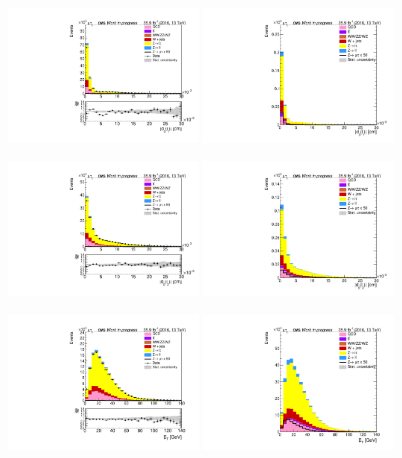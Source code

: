 \begin{figure}[htp]
	\includegraphics[width=0.45\textwidth]{plots/mt/ImpactParameter1_CR.pdf}
	\includegraphics[width=0.45\textwidth]{plots/mt/ImpactParameter1_withsignal.pdf}

	\includegraphics[width=0.45\textwidth]{plots/mt/ImpactParameter2_CR.pdf}
	\includegraphics[width=0.45\textwidth]{plots/mt/ImpactParameter2_withsignal.pdf}

	\includegraphics[width=0.45\textwidth]{plots/mt/MissingTranverseEnergy_CR.pdf}
	\includegraphics[width=0.45\textwidth]{plots/mt/MissingTranverseEnergy_withsignal.pdf}
\end{figure}
